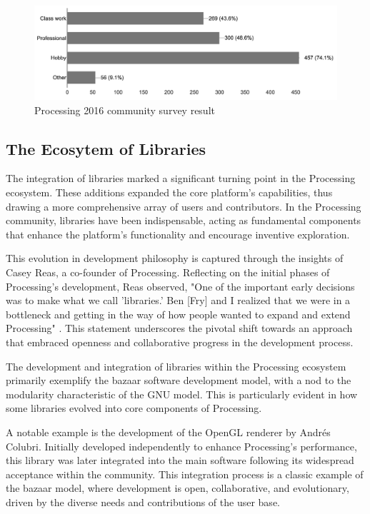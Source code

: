 \begin{figure}[h!]
	\centering
	\includegraphics[width=\textwidth]{images/community-survey.png}
	\caption[Processing 2016 community survey]{Processing 2016 community survey result \parencite{processingfoundation2016CommunitySurvey2016}}
	\label{fig:community_survey}
\end{figure}

\subsection{The Ecosytem of Libraries}
The integration of libraries marked a significant turning point in the Processing ecosystem. These additions expanded the core platform's capabilities, thus drawing a more comprehensive array of users and contributors. In the Processing community, libraries have been indispensable, acting as fundamental components that enhance the platform's functionality and encourage inventive exploration.

This evolution in development philosophy is captured through the insights of Casey Reas, a co-founder of Processing. Reflecting on the initial phases of Processing's development, Reas observed, "One of the important early decisions was to make what we call 'libraries.' Ben [Fry] and I realized that we were in a bottleneck and getting in the way of how people wanted to expand and extend Processing" \parencite[329]{conradGraphicDesignPostdigital2021}. This statement underscores the pivotal shift towards an approach that embraced openness and collaborative progress in the development process.

The development and integration of libraries within the Processing ecosystem primarily exemplify the bazaar software development model, with a nod to the modularity characteristic of the GNU model. This is particularly evident in how some libraries evolved into core components of Processing.

A notable example is the development of the OpenGL renderer by Andrés Colubri. Initially developed independently to enhance Processing's performance, this library was later integrated into the main software following its widespread acceptance within the community. This integration process is a classic example of the bazaar model, where development is open, collaborative, and evolutionary, driven by the diverse needs and contributions of the user base.  \parencite{fryProcessingContributionGuide2022}

